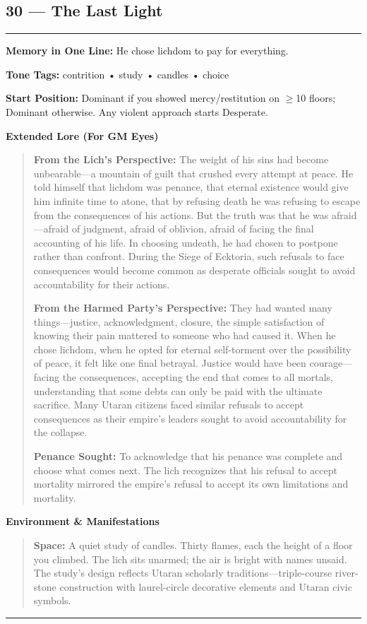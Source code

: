 \documentclass[18pt, letterpaper, twoside]{article}
\newenvironment{floorbox}[1]{%
    \begin{center}
    \begin{minipage}{0.95\textwidth}
    \subsection*{#1}
    \vspace{-0.5em}
    \rule{\textwidth}{0.5pt}
    \vspace{0.5em}
}{%
    \vspace{0.5em}
    \rule{\textwidth}{0.5pt}
    \end{minipage}
    \end{center}
}
\newenvironment{gmnote}[1]{%
    \vspace{0.5em}
    \noindent\textbf{#1}
    \begin{quote}
}{%
    \end{quote}
    \vspace{0.5em}
}
\newcommand{\memoryline}[1]{\noindent\textbf{Memory in One Line:} #1\par}
\newcommand{\tonetags}[1]{\noindent\textbf{Tone Tags:} #1\par}
\newcommand{\startposition}[1]{\noindent\textbf{Start Position:} #1\par}
\begin{document}
\begin{floorbox}{30 --- The Last Light}
\memoryline{He chose lichdom to pay for everything.}
\tonetags{contrition • study • candles • choice}
\startposition{Dominant if you showed mercy/restitution on $\geq$10 floors; Dominant otherwise. Any violent approach starts Desperate.}

\begin{gmnote}{Extended Lore (For GM Eyes)}
\textbf{From the Lich's Perspective:} The weight of his sins had become unbearable---a mountain of guilt that crushed every attempt at peace. He told himself that lichdom was penance, that eternal existence would give him infinite time to atone, that by refusing death he was refusing to escape from the consequences of his actions. But the truth was that he was afraid---afraid of judgment, afraid of oblivion, afraid of facing the final accounting of his life. In choosing undeath, he had chosen to postpone rather than confront. During the Siege of Ecktoria, such refusals to face consequences would become common as desperate officials sought to avoid accountability for their actions.

\textbf{From the Harmed Party's Perspective:} They had wanted many things---justice, acknowledgment, closure, the simple satisfaction of knowing their pain mattered to someone who had caused it. When he chose lichdom, when he opted for eternal self-torment over the possibility of peace, it felt like one final betrayal. Justice would have been courage---facing the consequences, accepting the end that comes to all mortals, understanding that some debts can only be paid with the ultimate sacrifice. Many Utaran citizens faced similar refusals to accept consequences as their empire's leaders sought to avoid accountability for the collapse.

\textbf{Penance Sought:} To acknowledge that his penance was complete and choose what comes next. The lich recognizes that his refusal to accept mortality mirrored the empire's refusal to accept its own limitations and mortality.
\end{gmnote}

\begin{gmnote}{Environment \& Manifestations}
\textbf{Space:} A quiet study of candles. Thirty flames, each the height of a floor you climbed. The lich sits unarmed; the air is bright with names unsaid. The study's design reflects Utaran scholarly traditions---triple-course river-stone construction with laurel-circle decorative elements and Utaran civic symbols.


\end{gmnote}
\end{floorbox}
\end{document}
